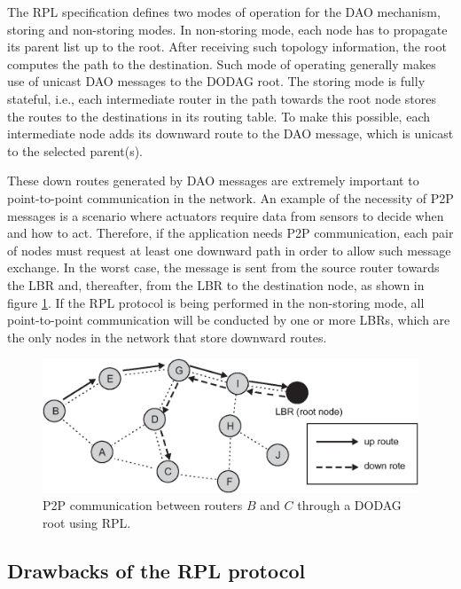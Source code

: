 \documentclass[authoryear,preprint,review,12pt]{elsarticle}
\begin{document}
The RPL specification defines two modes of operation for the DAO mechanism, storing and non-storing modes. In non-storing mode, each node has to propagate its parent list up to the root. After receiving such topology information, the root computes the path to the destination. Such mode of operating generally makes use of unicast DAO messages to the DODAG root. The storing mode is fully stateful, i.e., each intermediate router in the path towards the root node stores the routes to the destinations in its routing table. To make this possible, each intermediate node adds its downward route to the DAO message, which is unicast to the selected parent(s).

These down routes generated by DAO messages are extremely important to point-to-point communication in the network. An example of the necessity of P2P messages is a scenario where actuators require data from sensors to decide when and how to act. Therefore, if the application needs P2P communication, each pair of nodes must request at least one downward path in order to allow such message exchange. In the worst case, the message is sent from the source router towards the LBR and, thereafter, from the LBR to the destination node, as shown in figure \ref{RPL_DAO}. If the RPL protocol is being performed in the non-storing mode, all point-to-point communication will be conducted by one or more LBRs, which are the only nodes in the network that store downward routes.

\begin{figure}[h!tb]
\centering
\includegraphics[width=1\textwidth]{figures/RPL_DAO}
\caption{P2P communication between routers $B$ and $C$ through a DODAG root using RPL.}
\label{RPL_DAO}
\end{figure}

\subsection{Drawbacks of the RPL protocol}
\end{document}
